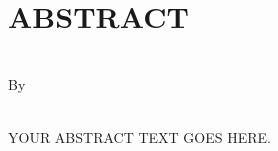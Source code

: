 \chapter{\normalfont ABSTRACT}

\begin{center}

  \textbf{\cThesisTitle}\\

  By\\
  \cAuthorName \\
  \cGraduationDate

\end{center}

YOUR ABSTRACT TEXT GOES HERE.
